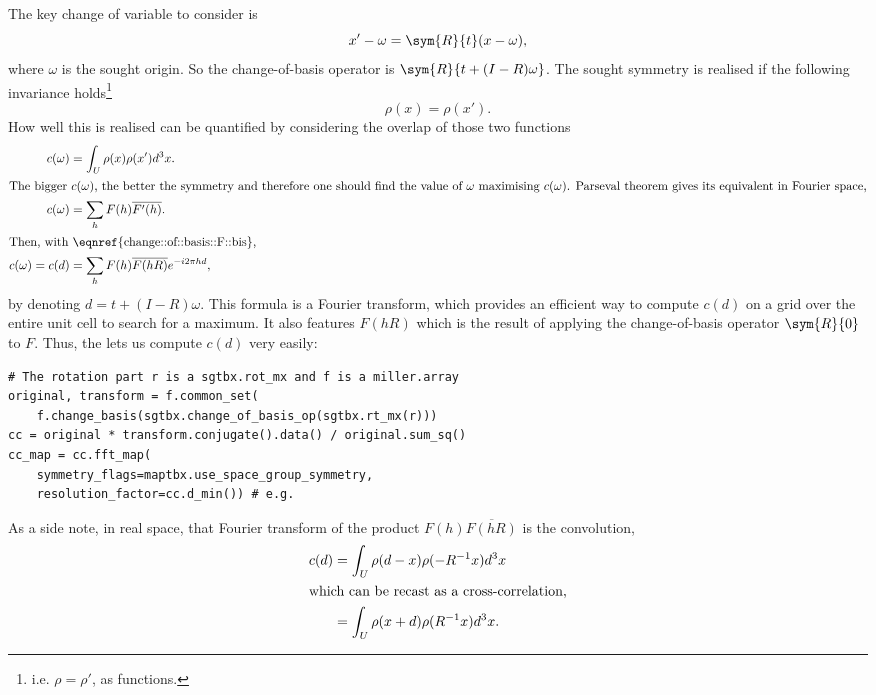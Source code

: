 \documentclass[11pt]{article}
\begin{document}
The key change of variable to consider is
\begin{equation}
x' - \omega = \sym{R}{t}(x - \omega),
\end{equation}
where $\omega$ is the sought origin. So the change-of-basis operator is $\sym{R}{t + (I-R)\omega}$.
The sought symmetry is realised if the following invariance holds\footnote{i.e. $\rho = \rho'$, as functions.}
\begin{equation}
\rho(x) = \rho(x').
\end{equation}
How well this is realised can be quantified by considering the overlap of those two functions
\begin{align}
c(\omega) &= \int_U \rho(x) \rho(x') d^3x.\\
\intertext{The bigger $c(\omega)$, the better the symmetry and therefore one should find the value of $\omega$ maximising $c(\omega)$. Parseval theorem gives its equivalent in Fourier space,}
c(\omega) &= \sum_h F(h) \overline{F'(h)}. \nonumber\\
\intertext{Then, with \eqnref{change::of::basis::F::bis}, }
c(\omega) = c(d) &= \sum_h F(h) \overline{F(hR)} e^{-i 2\pi h d}, 
\end{align}
by denoting $d=t + (I-R)\omega$. This formula is a Fourier transform, which provides an efficient way to compute $c(d)$ on a grid over the entire unit cell to search for a maximum. It also features $F(hR)$ which is the result of applying the change-of-basis operator $\sym{R}{0}$ to $F$. Thus, the  lets us compute $c(d)$ very easily:
\begin{lstlisting}
# The rotation part r is a sgtbx.rot_mx and f is a miller.array
original, transform = f.common_set(
	f.change_basis(sgtbx.change_of_basis_op(sgtbx.rt_mx(r)))
cc = original * transform.conjugate().data() / original.sum_sq()
cc_map = cc.fft_map(
	symmetry_flags=maptbx.use_space_group_symmetry,
	resolution_factor=cc.d_min()) # e.g.
\end{lstlisting}


As a side note, in real space, that Fourier transform of the product $F(h) \overline{F(hR)}$ is the convolution,
\begin{align}
c(d) &= \int_U \rho(d-x) \rho(-R^{-1}x) d^3x \nonumber\\
\intertext{which can be recast as a cross-correlation,}
&= \int_U \rho(x+d) \rho(R^{-1}x) d^3x. \nonumber
\end{align}
\end{document}
